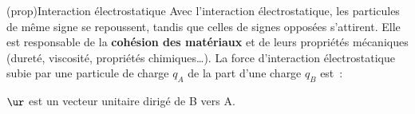 \documentclass[../../main/main.tex]{subfiles}
\begin{document}
\begin{tcb*}(prop){Interaction électrostatique}
	Avec l'interaction électrostatique, les particules de même signe se repoussent,
	tandis que celles de signes opposées s'attirent. Elle est responsable de
	la \textbf{cohésion des matériaux} et de leurs propriétés mécaniques
	(dureté, viscosité, propriétés chimiques…).
	\smallbreak
	La force d'interaction électrostatique subie par une particule de charge
	$q_A$ de la part d'une charge $q_B$ est~:
	\smallbreak
	\begin{isd}
		\psw{
			\[
				\Ff_{e,\rm B\ra A} = \frac{1}{4\pi\ep_0} \frac{q_Aq_B}{\rm BA^2}\ur
				\qavec
				\ur = \frac{\vv{\rm BA}}{\rm BA}
			\]
		}
		$\ur$ est un vecteur unitaire dirigé de B vers A.
		\tcblower
		\begin{center}
			\vspace{-15pt}
		\end{center}
	\end{isd}
\end{tcb*}
\end{document}
